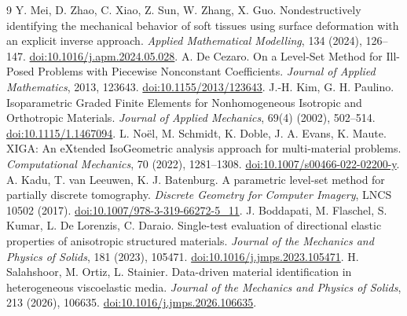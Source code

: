 \documentclass[11pt,a4paper]{ctexart}
\begin{document}
\begin{thebibliography}{9}
 Y. Mei, D. Zhao, C. Xiao, Z. Sun, W. Zhang, X. Guo.
Nondestructively identifying the mechanical behavior of soft tissues using surface deformation with an explicit inverse approach.
\emph{Applied Mathematical Modelling}, 134 (2024), 126--147.
\href{https://doi.org/10.1016/j.apm.2024.05.028}{doi:10.1016/j.apm.2024.05.028}.
 A. De Cezaro.
On a Level-Set Method for Ill-Posed Problems with Piecewise Nonconstant Coefficients.
\emph{Journal of Applied Mathematics}, 2013, 123643.
\href{https://doi.org/10.1155/2013/123643}{doi:10.1155/2013/123643}.
 J.-H. Kim, G. H. Paulino.
Isoparametric Graded Finite Elements for Nonhomogeneous Isotropic and Orthotropic Materials.
\emph{Journal of Applied Mechanics}, 69(4) (2002), 502--514.
\href{https://doi.org/10.1115/1.1467094}{doi:10.1115/1.1467094}.
 L. No\"el, M. Schmidt, K. Doble, J. A. Evans, K. Maute.
XIGA: An eXtended IsoGeometric analysis approach for multi-material problems.
\emph{Computational Mechanics}, 70 (2022), 1281--1308.
\href{https://doi.org/10.1007/s00466-022-02200-y}{doi:10.1007/s00466-022-02200-y}.
 A. Kadu, T. van Leeuwen, K. J. Batenburg.
A parametric level-set method for partially discrete tomography.
\emph{Discrete Geometry for Computer Imagery}, LNCS 10502 (2017).
\href{https://doi.org/10.1007/978-3-319-66272-5_11}{doi:10.1007/978-3-319-66272-5\_11}.
 J. Boddapati, M. Flaschel, S. Kumar, L. De Lorenzis, C. Daraio.
Single-test evaluation of directional elastic properties of anisotropic structured materials.
\emph{Journal of the Mechanics and Physics of Solids}, 181 (2023), 105471.
\href{https://doi.org/10.1016/j.jmps.2023.105471}{doi:10.1016/j.jmps.2023.105471}.
 H. Salahshoor, M. Ortiz, L. Stainier.
Data-driven material identification in heterogeneous viscoelastic media.
\emph{Journal of the Mechanics and Physics of Solids}, 213 (2026), 106635.
\href{https://doi.org/10.1016/j.jmps.2026.106635}{doi:10.1016/j.jmps.2026.106635}.
\end{thebibliography}
\end{document}
